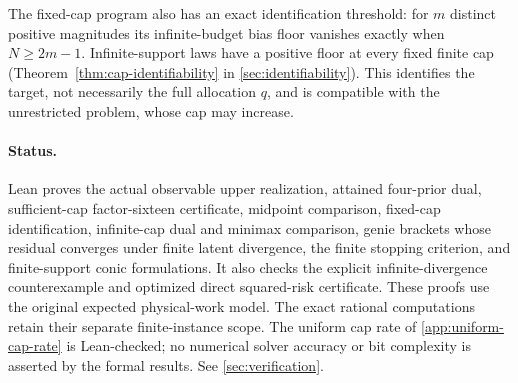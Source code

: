 The fixed-cap program also has an exact identification threshold:
for $m$ distinct positive magnitudes its infinite-budget bias floor
vanishes exactly when $N\ge2m-1$. Infinite-support laws have a positive
floor at every fixed finite cap (Theorem~\ref{thm:cap-identifiability}
in \cref{sec:identifiability}). This identifies the target, not
necessarily the full allocation $q$, and is compatible with the
unrestricted problem, whose cap may increase.

\paragraph{Status.}
Lean proves the actual observable upper realization, attained
four-prior dual, sufficient-cap factor-sixteen certificate, midpoint
comparison, fixed-cap identification, infinite-cap dual and minimax
comparison, genie brackets whose residual converges under finite latent
divergence, the finite stopping criterion, and finite-support conic
formulations. It also checks the explicit
infinite-divergence counterexample and optimized direct squared-risk
certificate. These proofs use the original expected physical-work model.
The exact rational computations retain their separate finite-instance
scope. The uniform cap rate of \cref{app:uniform-cap-rate} is Lean-checked;
no numerical solver accuracy or bit complexity is asserted by the formal results. See \cref{sec:verification}.
